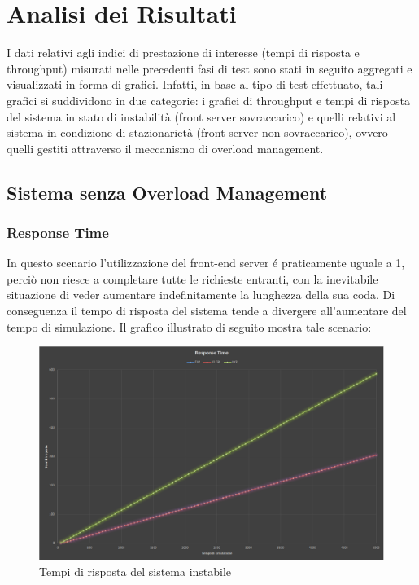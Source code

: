 \chapter{Analisi dei Risultati} 

I dati relativi agli indici di prestazione di interesse (tempi di risposta e 
throughput) misurati 
nelle precedenti fasi di test sono stati in seguito aggregati e visualizzati in 
forma di grafici. 
Infatti, in base al tipo di test effettuato, tali grafici si suddividono in due 
categorie: i grafici di 
throughput e tempi di risposta del sistema in stato di instabilit\`a (front 
server sovraccarico) e 
quelli relativi al sistema in condizione di stazionariet\`a (front server non 
sovraccarico), ovvero quelli gestiti
attraverso il meccanismo di overload management.

\section{Sistema senza Overload Management}

\subsection{Response Time}

In questo scenario l'utilizzazione del front-end server \'e praticamente uguale 
a 1, perci\`o 
non riesce a completare tutte le richieste entranti, con la inevitabile 
situazione di veder aumentare indefinitamente la lunghezza della sua coda. Di 
conseguenza il tempo di risposta del sistema tende a divergere all'aumentare del 
tempo di 
simulazione. Il grafico illustrato di seguito mostra tale scenario:

\begin{figure}[H]
 \centering
 \includegraphics[scale=0.45]{img/responseTime.png}
 \caption[Tempi di risposta del sistema instabile]{Tempi di risposta del sistema 
instabile}
 \label{fig:Tempi di risposta del sistema instabile}
\end{figure}

